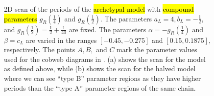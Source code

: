 \begin{figure}
	\centering
	\caption[2D scans of the periods of the archetypal model]{
		2D scan of the periods of the \hl{archetypal model} with \hl{compound parameters} $g_R\left(\frac{1}{4}\right)$ and $g_R\left(\frac{1}{2}\right)$.
		The parameters $a_L = 4, b_L = -\frac{1}{2},$ and $g_R\left(\frac{1}{2}\right) = \frac{1}{2} + \frac{1}{40}$ are fixed.
		The parameters $\alpha = -g_R\left(\frac{1}{4}\right)$ and $\beta = c_L$ are varied in the ranges $[-0.45, -0.275]$ and $[0.15, 0.1875]$, respectively.
		The points $A, B,$ and $C$ mark the parameter values used for the cobweb diagrams in .
		(a) shows the scan for the model as defined above, while (b) shows the scan for the halved model where we can see ``type B'' parameter regions as they have higher periods than the ``type A'' parameter regions of the same chain.
	}
	\label{fig:setup.arch.period}
\end{figure}

